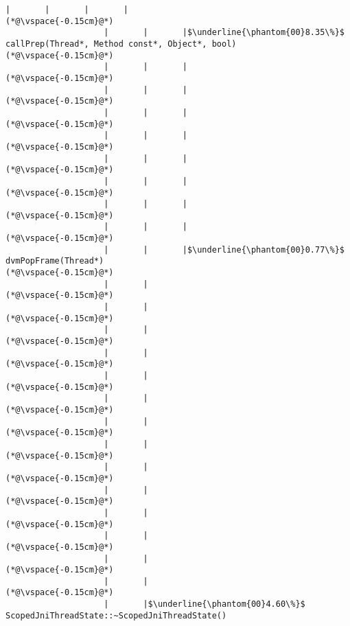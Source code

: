 \begin{lstlisting}[caption=Staattinen metodi C$\to$Java , label=profile:C2JBenchmark00001, numberbychapter=true, frame=lines, float, floatplacement=t]
                    |       |       |       |
(*@\vspace{-0.15cm}@*)
                    |       |       |$\underline{\phantom{00}8.35\%}$ callPrep(Thread*, Method const*, Object*, bool)
(*@\vspace{-0.15cm}@*)
                    |       |       |
(*@\vspace{-0.15cm}@*)
                    |       |       |
(*@\vspace{-0.15cm}@*)
                    |       |       |
(*@\vspace{-0.15cm}@*)
                    |       |       |
(*@\vspace{-0.15cm}@*)
                    |       |       |
(*@\vspace{-0.15cm}@*)
                    |       |       |
(*@\vspace{-0.15cm}@*)
                    |       |       |
(*@\vspace{-0.15cm}@*)
                    |       |       |
(*@\vspace{-0.15cm}@*)
                    |       |       |$\underline{\phantom{00}0.77\%}$ dvmPopFrame(Thread*)
(*@\vspace{-0.15cm}@*)
                    |       |
(*@\vspace{-0.15cm}@*)
                    |       |
(*@\vspace{-0.15cm}@*)
                    |       |
(*@\vspace{-0.15cm}@*)
                    |       |
(*@\vspace{-0.15cm}@*)
                    |       |
(*@\vspace{-0.15cm}@*)
                    |       |
(*@\vspace{-0.15cm}@*)
                    |       |
(*@\vspace{-0.15cm}@*)
                    |       |
(*@\vspace{-0.15cm}@*)
                    |       |
(*@\vspace{-0.15cm}@*)
                    |       |
(*@\vspace{-0.15cm}@*)
                    |       |
(*@\vspace{-0.15cm}@*)
                    |       |
(*@\vspace{-0.15cm}@*)
                    |       |
(*@\vspace{-0.15cm}@*)
                    |       |
(*@\vspace{-0.15cm}@*)
                    |       |$\underline{\phantom{00}4.60\%}$ ScopedJniThreadState::~ScopedJniThreadState()

\end{lstlisting}
